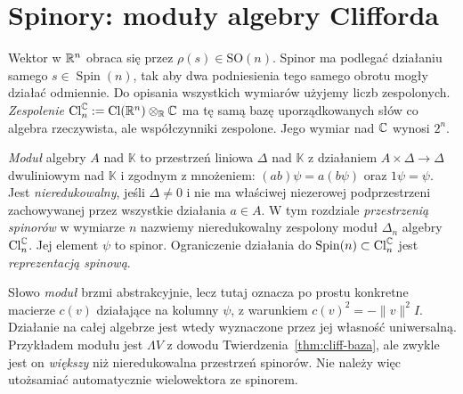 \section{Spinory: moduły algebry Clifforda}
\label{sec:spinory}

Wektor w $\mathbb{R}^n$ obraca się przez $\rho(s)\in\mathrm{SO}(n)$.
Spinor ma podlegać działaniu samego $s\in\operatorname{Spin}(n)$,
tak aby dwa podniesienia tego samego obrotu mogły
działać odmiennie. Do opisania wszystkich wymiarów
użyjemy liczb zespolonych. \emph{Zespolenie}
$\operatorname{Cl}^{\mathbb{C}}_n:=
\operatorname{Cl}(\mathbb{R}^n)\otimes_{\mathbb{R}}\mathbb{C}$
ma tę samą bazę uporządkowanych słów co algebra
rzeczywista, ale współczynniki zespolone.
Jego wymiar nad $\mathbb{C}$ wynosi $2^n$.

\begin{definicja}
\label{def:spinor}
\emph{Moduł} algebry $A$ nad $\mathbb K$ to przestrzeń liniowa
$\Delta$ nad $\mathbb K$ z działaniem $A\times\Delta\to\Delta$
dwuliniowym nad $\mathbb K$ i zgodnym
z mnożeniem: $(ab)\psi=a(b\psi)$
oraz $1\psi=\psi$. Jest \emph{nieredukowalny},
jeśli $\Delta\ne0$ i nie ma właściwej niezerowej podprzestrzeni
zachowywanej przez wszystkie działania $a\in A$.
W tym rozdziale \emph{przestrzenią spinorów}
w wymiarze $n$ nazwiemy nieredukowalny zespolony
moduł $\Delta_n$ algebry $\operatorname{Cl}^{\mathbb{C}}_n$.
Jej element $\psi$ to spinor. Ograniczenie
działania do $\operatorname{Spin}(n)\subset
\operatorname{Cl}^{\mathbb{C}}_n$ jest
\emph{reprezentacją spinową}.
\end{definicja}

Słowo \emph{moduł} brzmi abstrakcyjnie, lecz tutaj
oznacza po prostu konkretne macierze $c(v)$
działające na kolumny $\psi$, z warunkiem
$c(v)^2=-\|v\|^2 I$. Działanie na całej algebrze
jest wtedy wyznaczone przez jej własność uniwersalną.
Przykładem modułu jest $\Lambda V$ z dowodu
Twierdzenia~\ref{thm:cliff-baza}, ale zwykle jest
on \emph{większy} niż nieredukowalna przestrzeń
spinorów. Nie należy więc utożsamiać automatycznie
wielowektora ze spinorem.


